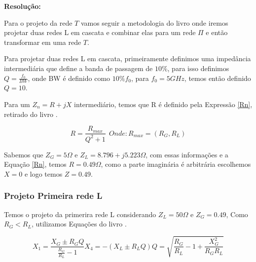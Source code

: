 \documentclass[a4paper,12pt]{proc}
\begin{document}
\singlespacing

\textbf{Resolução:}

\singlespacing

\noindent Para o projeto da rede $T$ vamos seguir a metodologia do livro \cite{Orfanidis2003} onde iremos projetar duas redes L em cascata e combinar elas para um rede $\Pi$ e então transformar em uma rede $T$.

\singlespacing

\noindent Para projetar duas redes L em cascata, primeiramente definimos uma impedância intermediária que define a banda de passagem de $10\%$, para isso definimos $Q = \frac{f_{0}}{BW}$, onde BW é definido como $10\%f_{0}$, para $f_{0} = 5 GHz$, temos então definido $Q = 10$.

\singlespacing

\noindent Para um $Z_{n} = R + jX $ intermediário, temos que R é definido pela Expressão \ref{Rn}, retirado do livro \cite{Orfanidis2003}.

\begin{equation}
    R = \frac{R_{max}}{Q^{2}+1}~~Onde:R_{max} = (R_{G},R_{L})
    \label{Rn}
\end{equation}

Sabemos que $ Z_{G} = 5 \Omega$ e $Z_{L} = 8.796 + j5.223 \Omega $, com essas informações e a Equação \ref{Rn}, temos $R = 0.49 \Omega$, como a parte imaginária é arbitrária escolhemos $X = 0 $ e logo temos $Z = 0.49$.

\subsubsection{Projeto Primeira rede L}

Temos o projeto da primerira rede L considerando $Z_{L} = 50 \Omega$ e $Z_{G} = 0.49$, Como $R_{G} < R_{L}$, utilizamos Equações do livro \cite{Orfanidis2003}.

\begin{subequations}
    \label{eqn3_t}
    \begin{equation}
        \label{eqn3_t:1}
        X_{1} = \frac{X_{G}\pm R_{G}Q}{\frac{R_{G}}{R_{L}}-1} 
    \end{equation}

    \begin{equation}
        \label{eqn3_t:2}
        X_{4} = -(X_{L}\pm R_{L}Q)
    \end{equation}

    \begin{equation}
        \label{eqn3_t:3}
        Q = \sqrt{\frac{R_{G}}{R_{L}}-1+\frac{X_{G}^{2}}{R_{G}R_{L}}}
    \end{equation}

\end{subequations}
\end{document}
